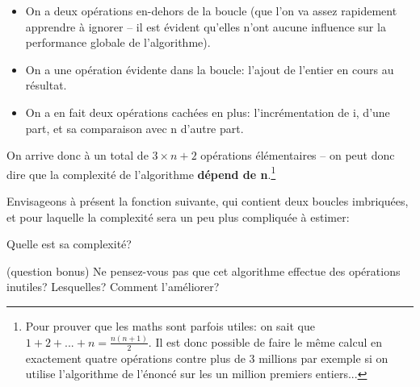 \documentclass[12pt]{article}
\begin{document}
	\begin{MaReponse}
		\begin{itemize}
			\item On a deux opérations en-dehors de la boucle (que l'on va assez rapidement apprendre à ignorer -- il est évident qu'elles n'ont aucune influence sur la performance globale de l'algorithme).
			\item On a une opération évidente dans la boucle: l'ajout de l'entier en cours au résultat.
			\item On a en fait deux opérations cachées en plus: l'incrémentation de i, d'une part, et sa comparaison avec n d'autre part.
		\end{itemize}
		
		On arrive donc à un total de $3 \times n + 2$ opérations élémentaires -- on peut donc dire que la complexité de l'algorithme \textbf{dépend de n}.\footnote{Pour prouver que les maths sont parfois utiles: on sait que $1 + 2 + ... + n = \frac{n(n + 1)}{2}$. Il est donc possible de faire le même calcul en exactement quatre opérations contre plus de 3 millions par exemple si on utilise l'algorithme de l'énoncé sur les un million premiers entiers...}
	\end{MaReponse}
	
	\begin{MonExo}
		Envisageons à présent la fonction suivante, qui contient deux boucles imbriquées, et pour laquelle la complexité sera un peu plus compliquée à estimer:
		\begin{alphenum}
			\item Quelle est sa complexité?
			\item (question bonus) Ne pensez-vous pas que cet algorithme effectue des opérations inutiles? Lesquelles? Comment l'améliorer?
		\end{alphenum}
	\end{MonExo}
	
\end{document}
